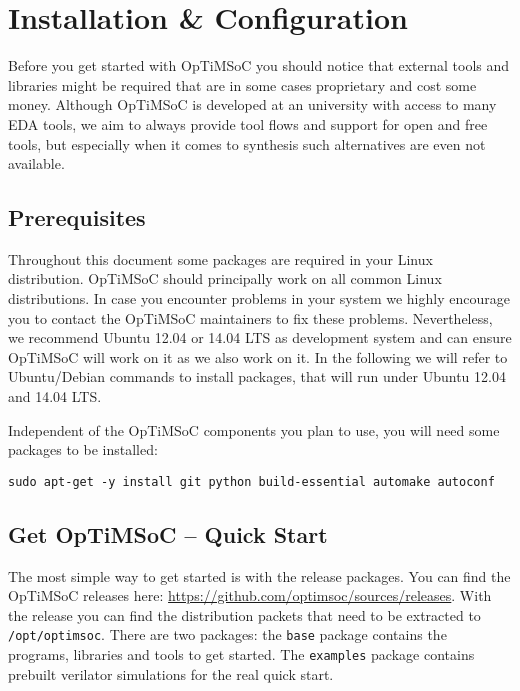 \chapter{Installation \& Configuration}
\label{chap:installation}

Before you get started with OpTiMSoC you should notice that external
tools and libraries might be required that are in some cases
proprietary and cost some money. Although OpTiMSoC is developed at an
university with access to many EDA tools, we aim to always provide
tool flows and support for open and free tools, but especially when it
comes to synthesis such alternatives are even not available.

\section{Prerequisites}

Throughout this document some packages are required in your Linux
distribution. OpTiMSoC should principally work on all common Linux
distributions. In case you encounter problems in your system we highly
encourage you to contact the OpTiMSoC maintainers to fix these
problems. Nevertheless, we recommend Ubuntu 12.04 or 14.04 LTS as
development system and can ensure OpTiMSoC will work on it as we also
work on it. In the following we will refer to Ubuntu/Debian commands
to install packages, that will run under Ubuntu 12.04 and 14.04 LTS.

Independent of the OpTiMSoC components you plan to use, you will need some
packages to be installed:

\begin{lstlisting}
sudo apt-get -y install git python build-essential automake autoconf
\end{lstlisting}

\section{Get OpTiMSoC -- Quick Start}

The most simple way to get started is with the release packages. You
can find the OpTiMSoC releases here:
\url{https://github.com/optimsoc/sources/releases}. With the release
you can find the distribution packets that need to be extracted to
\verb|/opt/optimsoc|. There are two packages: the \verb|base| package
contains the programs, libraries and tools to get started. The
\verb|examples| package contains prebuilt verilator simulations for
the real quick start.

